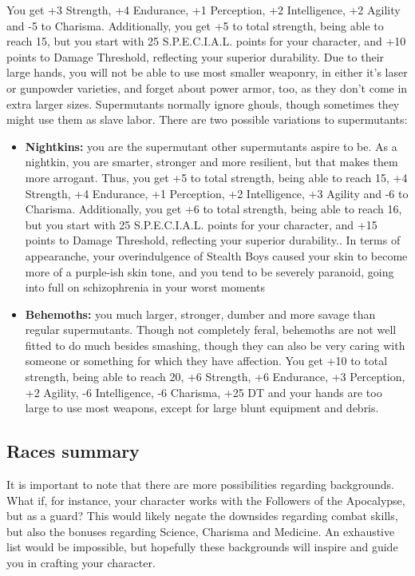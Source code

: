 \documentclass[11pt]{article} %
\begin{document}
You get +3 Strength, +4 Endurance, +1 Perception, +2 Intelligence, +2 Agility and -5 to Charisma. Additionally, you get +5 to total strength, being able to reach 15, but you start with 25 S.P.E.C.I.A.L. points for your character, and +10 points to Damage Threshold, reflecting your superior durability. Due to their large hands, you will not be able to use most smaller weaponry, in either it's laser or gunpowder varieties, and forget about power armor, too, as they don't come in extra larger sizes. Supermutants normally ignore ghouls, though sometimes they might use them as slave labor. There are two possible variations to supermutants:

\begin{itemize}
\item \textbf{Nightkins:} you are the supermutant other supermutants aspire to be. As a nightkin, you are smarter, stronger and more resilient, but that makes them more arrogant. Thus, you get +5 to total strength, being able to reach 15, +4 Strength, +4 Endurance, +1 Perception, +2 Intelligence, +3 Agility and -6 to Charisma. Additionally, you get +6 to total strength, being able to reach 16, but you start with 25 S.P.E.C.I.A.L. points for your character, and +15 points to Damage Threshold, reflecting your superior durability.. In terms of appearanche, your overindulgence of Stealth Boys caused your skin to become more of a purple-ish skin tone, and you tend to be severely paranoid, going into full on schizophrenia in your worst moments
\item \textbf{Behemoths:} you much larger, stronger, dumber and more savage than regular supermutants. Though not completely feral, behemoths are not well fitted to do much besides smashing, though they can also be very caring with someone or something for which they have affection. You get +10 to total strength, being able to reach 20, +6 Strength, +6 Endurance, +3 Perception, +2 Agility, -6 Intelligence, -6 Charisma, +25 DT and your hands are too large to use most weapons, except for large blunt equipment and debris.
\end{itemize}

\subsection{Races summary}

It is important to note that there are more possibilities regarding backgrounds. What if, for instance, your character works with the Followers of the Apocalypse, but as a guard? This would likely negate the downsides regarding combat skills, but also the bonuses regarding Science, Charisma and Medicine. An exhaustive list would be impossible, but hopefully these backgrounds will inspire and guide you in crafting your character.
\end{document}

